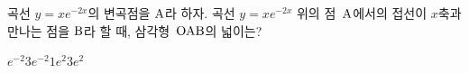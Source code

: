 곡선 $y=xe^{-2x}$의 변곡점을 $\mathrm{A}$라 하자. 곡선 $y=xe^{-2x}$ 위의 점~$\mathrm{A}$에서의 접선이 $x$축과 만나는 점을 $\mathrm{B}$라 할 때, 삼각형~$\mathrm{OAB}$의 넓이는? 
\begin{choices32}{$e^{-2}$}{$3e^{-2}$}{$1$}{$e^2$}{$3e^2$}\end{choices32}
